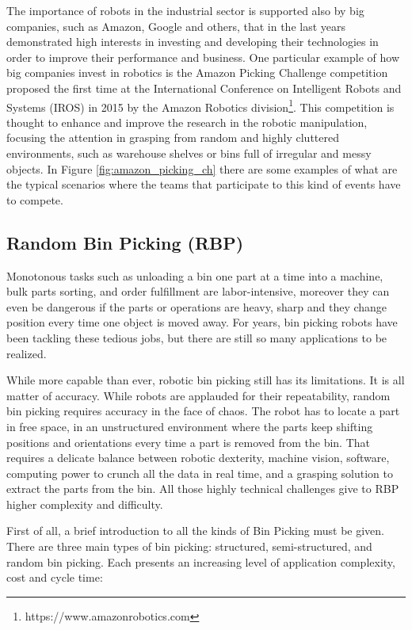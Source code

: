 The importance of robots in the industrial sector is supported also by big companies, such as Amazon, Google and others, that in the last years demonstrated high interests in investing and developing their technologies in order to improve their performance and business. One particular example of how big companies invest in robotics is the Amazon Picking Challenge competition proposed the first time at the International Conference on Intelligent Robots and Systems (IROS) in 2015 by the Amazon Robotics division\footnote{https://www.amazonrobotics.com}. This competition is thought to enhance and improve the research in the robotic manipulation, focusing the attention in grasping from random and highly cluttered environments, such as warehouse shelves or bins full of irregular and messy objects. In Figure \ref{fig:amazon_picking_ch} there are some examples of what are the typical scenarios where the teams that participate to this kind of events have to compete.

\subsection{Random Bin Picking (RBP)}\label{subsec:binpicking}
Monotonous tasks such as unloading a bin one part at a time into a machine, bulk parts sorting, and order fulfillment are labor-intensive, moreover they can even be dangerous if the parts or operations are heavy, sharp and they change position every time one object is moved away. For years, bin picking robots have been tackling these tedious jobs, but there are still so many applications to be realized.

While more capable than ever, robotic bin picking still has its limitations. It is all matter of accuracy. While robots are applauded for their repeatability, random bin picking requires accuracy in the face of chaos. The robot has to locate a part in free space, in an unstructured environment where the parts keep shifting positions and orientations every time a part is removed from the bin. That requires a delicate balance between robotic dexterity, machine vision, software, computing power to crunch all the data in real time, and a grasping solution to extract the parts from the bin. All those highly technical challenges give to RBP higher complexity and difficulty.

First of all, a brief introduction to all the kinds of Bin Picking must be given. There are three main types of bin picking: structured, semi-structured, and random bin picking. Each presents an increasing level of application complexity, cost and cycle time:

